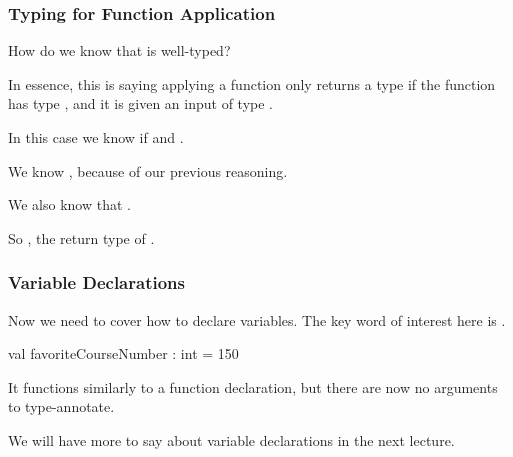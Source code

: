 \documentclass[aspectratio=169, handout]{beamer}
\begin{document}
\begin{frame}[fragile]
  \frametitle{Typing for Function Application}

  How do we know that  is well-typed?

  \pause
  \vspace{\fill}


   \pause
  \vspace{\fill}

  In essence, this is saying applying a function only returns a type  if
  the function has type , and it is given an input of type .

  \pause
  \vspace{\fill}

  In this case we know  if  and .

  \pause
  \vspace{3pt}

  We know , because of our previous reasoning.

  \pause
  \vspace{3pt}

  We also know that .

  \pause
  \vspace{\fill}

  So , the return type of .
\end{frame}

\begin{frame}[fragile]
  \frametitle{Variable Declarations}

  Now we need to cover how to declare variables. The key word of interest here is
  .

  \vspace{\fill}

  \begin{codeblock}
    val favoriteCourseNumber : int = 150
  \end{codeblock}

  \pause
  \vspace{\fill}

  It functions similarly to a function declaration, but there are now no arguments
  to type-annotate.

  \pause
  \vspace{\fill}

  We will have more to say about variable declarations in the next lecture.
\end{frame}
\end{document}
